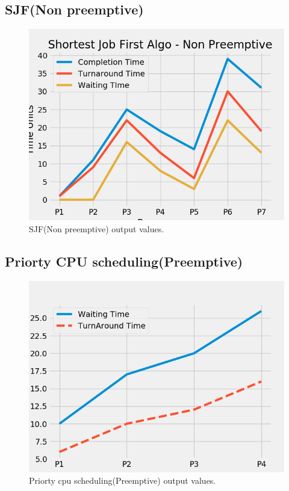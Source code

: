 \documentclass[11pt,a4paper]{report}
\begin{document}
{		\subsection*{SJF(Non preemptive)}
		{\begin{figure}[H]
		    \centering
		    \includegraphics[scale=0.75]{SJF_NP_output.png}
		    \caption{SJF(Non preemptive) output values.}
		    \label{fig:my_label}
		\end{figure}}
		\subsection*{Priorty CPU scheduling(Preemptive)}
		{\begin{figure}[H]
		    \centering
		    \includegraphics[scale=0.75]{PRIORITY_P_output.png}
		    \caption{Priorty cpu scheduling(Preemptive) output values.}
		\end{figure}}
}
\end{document}
